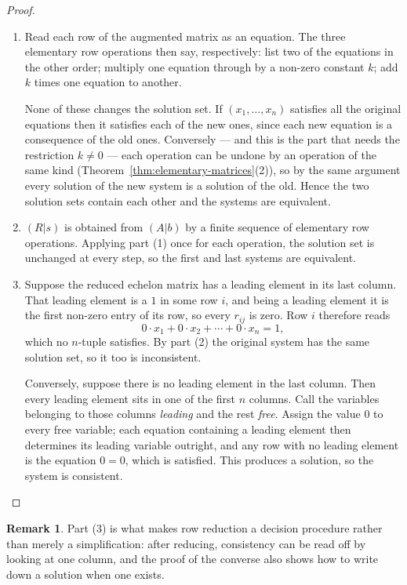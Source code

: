 \documentclass[11pt,a4paper]{article}
\theoremstyle{definition}
\newtheorem*{remark}{Remark}
\begin{document}
\begin{proof}
\begin{enumerate}
\item Read each row of the augmented matrix as an equation. The three
elementary row operations then say, respectively: list two of the equations in
the other order; multiply one equation through by a non-zero constant $k$; add
$k$ times one equation to another.

None of these changes the solution set. If $(x_1,\dots,x_n)$ satisfies all the
original equations then it satisfies each of the new ones, since each new
equation is a consequence of the old ones. Conversely --- and this is the part
that needs the restriction $k\neq 0$ --- each operation can be undone by an
operation of the same kind (Theorem~\ref{thm:elementary-matrices}(2)), so by
the same argument every solution of the new system is a solution of the old.
Hence the two solution sets contain each other and the systems are equivalent.

\item $(R|s)$ is obtained from $(A|b)$ by a finite sequence of elementary row
operations. Applying part (1) once for each operation, the solution set is
unchanged at every step, so the first and last systems are equivalent.

\item Suppose the reduced echelon matrix has a leading element in its last
column. That leading element is a $1$ in some row $i$, and being a leading
element it is the first non-zero entry of its row, so every $r_{ij}$ is zero.
Row $i$ therefore reads
$$0\cdot x_1+0\cdot x_2+\cdots+0\cdot x_n=1,$$
which no $n$-tuple satisfies. By part (2) the original system has the same
solution set, so it too is inconsistent.

Conversely, suppose there is no leading element in the last column. Then every
leading element sits in one of the first $n$ columns. Call the variables
belonging to those columns \emph{leading} and the rest \emph{free}. Assign the
value $0$ to every free variable; each equation containing a leading element
then determines its leading variable outright, and any row with no leading
element is the equation $0=0$, which is satisfied. This produces a solution, so
the system is consistent.
\end{enumerate}
\end{proof}

\begin{remark}
Part (3) is what makes row reduction a decision procedure rather than merely a
simplification: after reducing, consistency can be read off by looking at one
column, and the proof of the converse also shows how to write down a solution
when one exists.
\end{remark}
\end{document}
